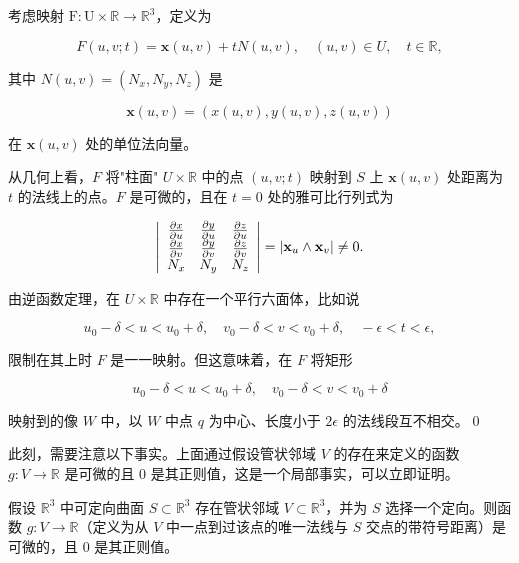 \begin{Proof}
考虑映射 $\mathrm{F}: \mathrm{U} \times \mathbb{R} \to \mathbb{R}^3$，定义为

\[
F(u, v; t) = \mathbf{x}(u, v) + t N(u, v), \quad (u, v) \in U, \quad t \in \mathbb{R},
\]

其中 $N(u,v) = (N_x,N_y,N_z)$ 是

\[
\mathbf{x}(u, v) = (x(u, v), y(u, v), z(u, v))
\]

在 $\mathbf{x}(u,v)$ 处的单位法向量。

从几何上看，$F$ 将"柱面" $U \times \mathbb{R}$ 中的点 $(u, v; t)$ 映射到 $S$ 上 $\mathbf{x}(u, v)$ 处距离为 $t$ 的法线上的点。$F$ 是可微的，且在 $t = 0$ 处的雅可比行列式为

\[
\left| \begin{array}{c c c} \frac{\partial x}{\partial u} & \frac{\partial y}{\partial u} & \frac{\partial z}{\partial u} \\ \frac{\partial x}{\partial v} & \frac{\partial y}{\partial v} & \frac{\partial z}{\partial v} \\ N_x & N_y & N_z \end{array} \right| = |\mathbf{x}_u \wedge \mathbf{x}_v| \neq 0.
\]

由逆函数定理，在 $U \times \mathbb{R}$ 中存在一个平行六面体，比如说

\[
u_0 - \delta < u < u_0 + \delta, \quad v_0 - \delta < v < v_0 + \delta, \quad -\epsilon < t < \epsilon,
\]

限制在其上时 $F$ 是一一映射。但这意味着，在 $F$ 将矩形

\[
u_0 - \delta < u < u_0 + \delta, \quad v_0 - \delta < v < v_0 + \delta
\]

映射到的像 $W$ 中，以 $W$ 中点 $q$ 为中心、长度小于 $2\epsilon$ 的法线段互不相交。\qed
\end{Proof}

此刻，需要注意以下事实。上面通过假设管状邻域 $V$ 的存在来定义的函数 $g: V \to \mathbb{R}$ 是可微的且 0 是其正则值，这是一个局部事实，可以立即证明。

\begin{Proposition}[管状邻域上距离函数的可微性]\label{prop:distance-function-differentiable}
假设 $\mathbb{R}^3$ 中可定向曲面 $S \subset \mathbb{R}^3$ 存在管状邻域 $V \subset \mathbb{R}^3$，并为 $S$ 选择一个定向。则函数 $g: V \to \mathbb{R}$（定义为从 $V$ 中一点到过该点的唯一法线与 $S$ 交点的带符号距离）是可微的，且 0 是其正则值。
\end{Proposition}

